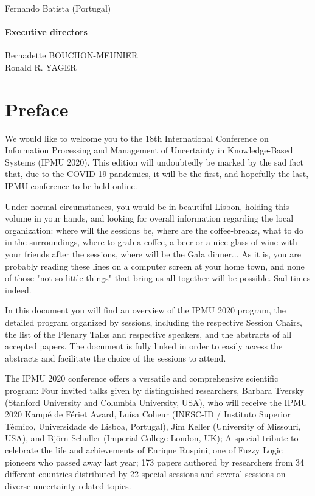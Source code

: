 \documentclass[11pt, twoside, b5paper]{extbook}
\newcommand{\mychapter}[1]{
    	\phantomsection
	\chapter*{#1}
	\addcontentsline{toc}{chapter}{#1}
	\markboth{#1}{#1}%
}
\begin{document}
Fernando Batista (Portugal)

\subsubsection*{Executive directors}

Bernadette BOUCHON-MEUNIER\\
Ronald R. YAGER


\mychapter{Preface} %
\vspace{5em}

%
We would like to welcome you to the 18th International Conference on Information Processing and Management of Uncertainty in Knowledge-Based Systems (IPMU 2020). This edition will undoubtedly be marked by the sad fact that, due to the COVID-19 pandemics, it will be the first, and hopefully the last, IPMU conference to be held online.

Under normal circumstances, you would be in beautiful Lisbon, holding this volume in your hands, and looking for overall information regarding the local organization: where will the sessions be, where are the coffee-breaks, what to do in the surroundings, where to grab a coffee, a beer or a nice glass of wine with your friends after the sessions, where will be the Gala dinner... As it is, you are probably reading these lines on a computer screen at your home town, and none of those "not so little things" that bring us all together will be possible. Sad times indeed.

In this document you will find an overview of the IPMU 2020 program, the detailed program organized by sessions, including the respective Session Chairs, the list of the Plenary Talks and respective speakers, and the abstracts of all accepted papers. The document is fully linked in order to easily access the abstracts and facilitate the choice of the sessions to attend.    

The IPMU 2020 conference offers a versatile and comprehensive scientific program: Four invited talks given by distinguished researchers, Barbara Tversky (Stanford University and Columbia University, USA), who will receive the IPMU 2020 Kampé de Fériet Award, Luísa Coheur (INESC-ID / Instituto Superior Técnico, Universidade de Lisboa, Portugal), Jim Keller (University of Missouri, USA), and Björn Schuller (Imperial College London, UK); A special tribute to celebrate the life and achievements of Enrique Ruspini, one of Fuzzy Logic pioneers who passed away last year;  173 papers authored by researchers from 34 different countries distributed by 22 special sessions and several sessions on diverse uncertainty related topics. 
\end{document}
